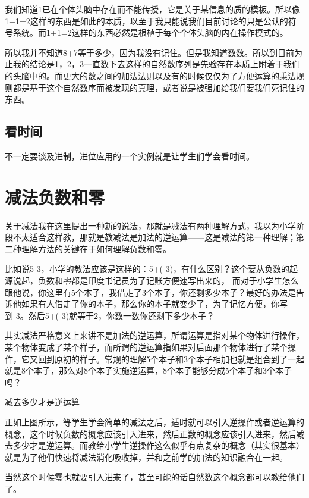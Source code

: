 \documentclass[12pt]{exam}%
\begin{document}
我们知道1已在个体头脑中存在而不能传授，它是关于某信息的质的模板。所以像1+1=2这样的东西是如此的本质，以至于我只能说我们目前讨论的只是公认的符号系统。而1+1=2这样的东西必然是根植于每个个体头脑的内在操作模式的。

所以我并不知道8+7等于多少，因为我没有记住。但是我知道数数。所以到目前为止我的结论是1，2，3一直数下去这样的自然数序列是先验存在本质上附着于我们的头脑中的。而更大的数之间的加法法则以及有的时候仅仅为了方便运算的乘法规则都是基于这个自然数序而被发现的真理，或者说是被强加给我们要我们死记住的东西。

\subsection{看时间}
不一定要谈及进制，进位应用的一个实例就是让学生们学会看时间。

\section{减法负数和零}
关于减法我在这里提出一种新的说法，那就是减法有两种理解方式，我以为小学阶段不太适合这样教，那就是教减法是加法的逆运算——这是减法的第一种理解；第二种理解方法的关键在于如何理解负数和零。

比如说5-3，小学的教法应该是这样的：5+(-3)，有什么区别？这个要从负数的起源说起，负数和零都是印度书记员为了记账方便速写出来的， 而对于小学生怎么跟他说，你这里有5个本子，我借走了3个本子，你还剩多少本子？最好的办法是告诉他如果有人借走了你的本子，那么你的本子就变少了，为了记忆方便，你写到-3。然后5+(-3)就等于2，你数一数你还剩下多少本子？

其实减法严格意义上来讲不是加法的逆运算，所谓运算是指对某个物体进行操作，某个物体变成了某个样子，而所谓的逆运算指如果对后面那个物体进行了某个操作，它又回到原初的样子。常规的理解5个本子和3个本子相加也就是组合到了一起就是8个本子，那么对8个本子实施逆运算，8个本子能够分成5个本子和3个本子吗？
\begin{fig}[3]{减去多少才是逆运算}
\caption{减去多少才是逆运算}
\label{fig:减去多少才是逆运算}
\end{fig}

正如上图所示，等学生学会简单的减法之后，适时就可以引入逆操作或者逆运算的概念，这个时候负数的概念应该引入进来，然后正数的概念应该引入进来，然后减去多少才是逆运算。而教给小学生逆操作这么似乎有点复杂的概念（其实很基本）就是为了他们快速将减法消化吸收掉，并和之前学的加法的知识融合在一起。

当然这个时候零也就要引入进来了，甚至可能的话自然数这个概念都可以教给他们了。
\end{document}
